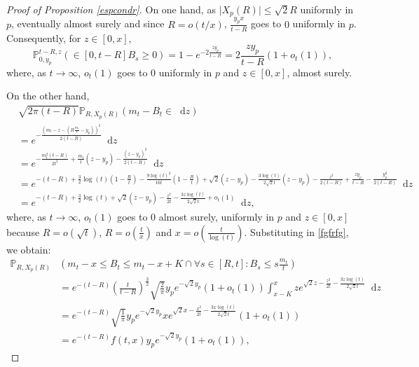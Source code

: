 \documentclass{article}
\newcommand{\Prob}{\mathbb{P}}
\begin{document}
\begin{proof}[Proof of Proposition \ref{espcondr}]
On one hand, as $\lvert X_p(R) \rvert \leq \sqrt{2}R$ uniformly in $p$, eventually almost surely and since $R=o(t/x)$, $\frac{y_p x}{t-R}$ goes to $0$ uniformly in $p$. Consequently, for $z\in[0,x]$, 
\begin{equation}
    \Prob_{0,y_p}^{t-R,z}(\in [0,t-R]B_s \geq 0)= 1-e^{-2\frac{zy_p}{t-R}} = 2\frac{zy_p}{t-R} (1+o_t(1)),
\end{equation}
where, as $t\to \infty$, $o_t(1)$ goes to 0 uniformly in $p$ and $z\in[0,x]$, almost surely.

On the other hand,
\begin{equation*}
    \begin{split}
         &\sqrt{2\pi (t-R)}\Prob_{R,X_p(R)}(m_t- B_t \in \mathop{}\!\mathrm{d}z)\\
         &= e^{-\frac{\left(m_t -z -\left(R\frac{m_t}{t}-y_p\right)\right)^2}{2(t-R)}}\mathop{}\!\mathrm{d}z\\
        &= e^{-\frac{m_t^2(t-R)}{2t^2} +\frac{m_t}{t}(z-y_p)-\frac{(z-y_p)^2}{2(t-R)}}\mathop{}\!\mathrm{d}z\\
        &= e^{-(t-R)+\frac{3}{2}\log(t)(1-\frac{R}{t})-\frac{9\log(t)^2}{16t}(1-\frac{R}{t}) +\sqrt{2}(z-y_p) -\frac{3\log(t)}{2\sqrt{2}t}(z-y_p)- \frac{z^2}{2(t-R)} +\frac{zy_p}{t-R}-\frac{y_p^2}{2(t-R)}}\mathop{}\!\mathrm{d}z\\
        &= e^{-(t-R)+\frac{3}{2}\log(t) +\sqrt{2}(z-y_p)- \frac{z^2}{2t} - \frac{3z\log(t)}{2\sqrt{2}t} +o_t(1)}\mathop{}\!\mathrm{d}z,
    \end{split}
\end{equation*}
where, as $t\to \infty$, $o_t(1)$ goes to 0 almost surely, uniformly in $p$ and $z \in [0,x]$ because $R=o(\sqrt{t})$, $R=o(\frac{t}{x})$ and $x=o\left(\frac{t}{\log(t)}\right)$.
Substituting in \eqref{fgfrfg}, we obtain:
\begin{equation}
    \begin{split}
        \Prob_{R,X_p(R)}&\left( m_t -x\leq B_t\leq m_t -x +K  \cap \forall s \in [R,t]: B_s\leq s\frac{m_t}{t} \right)\\
        &=e^{-(t-R)}\left(\frac{t}{t-R}\right)^{\frac{3}{2}} \sqrt{\frac{2}{\pi}} y_pe^{-\sqrt{2}y_p}(1+o_t(1))\int_{x-K}^x ze^{\sqrt{2}z- \frac{z^2}{2t} - \frac{3z\log(t)}{2\sqrt{2}t}}\mathop{}\!\mathrm{d}z\\
        &= e^{-(t-R)} \sqrt{\frac{1}{\pi}} y_pe^{-\sqrt{2}y_p}xe^{\sqrt{2}x- \frac{x^2}{2t} - \frac{3x\log(t)}{2\sqrt{2}t}}(1+o_t(1))\\
        &=e^{-(t-R)}f(t,x)y_pe^{-\sqrt{2}y_p}(1+o_t(1)),
    \end{split}
\end{equation}


\end{proof}
\end{document}
